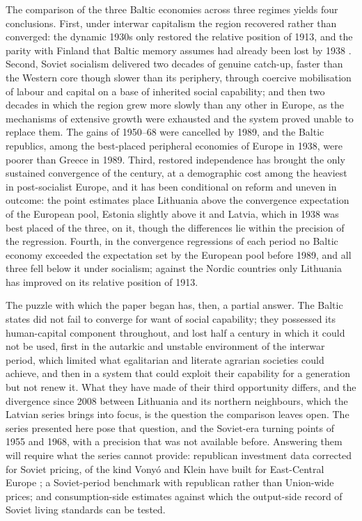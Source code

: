 The comparison of the three Baltic economies across three regimes yields four conclusions. First, under interwar capitalism the region recovered rather than converged: the dynamic 1930s only restored the relative position of 1913, and the parity with Finland that Baltic memory assumes had already been lost by 1938 \parencites[228]{vilpisauskas_2014_lithuania}[154]{norkus_2023_baltic}. Second, Soviet socialism delivered two decades of genuine catch-up, faster than the Western core though slower than its periphery, through coercive mobilisation of labour and capital on a base of inherited social capability; and then two decades in which the region grew more slowly than any other in Europe, as the mechanisms of extensive growth were exhausted and the system proved unable to replace them. The gains of 1950--68 were cancelled by 1989, and the Baltic republics, among the best-placed peripheral economies of Europe in 1938, were poorer than Greece in 1989. Third, restored independence has brought the only sustained convergence of the century, at a demographic cost among the heaviest in post-socialist Europe, and it has been conditional on reform and uneven in outcome: the point estimates place Lithuania above the convergence expectation of the European pool, Estonia slightly above it and Latvia, which in 1938 was best placed of the three, on it, though the differences lie within the precision of the regression. Fourth, in the convergence regressions of each period no Baltic economy exceeded the expectation set by the European pool before 1989, and all three fell below it under socialism; against the Nordic countries only Lithuania has improved on its relative position of 1913.

The puzzle with which the paper began has, then, a partial answer. The Baltic states did not fail to converge for want of social capability; they possessed its human-capital component throughout, and lost half a century in which it could not be used, first in the autarkic and unstable environment of the interwar period, which limited what egalitarian and literate agrarian societies could achieve, and then in a system that could exploit their capability for a generation but not renew it. What they have made of their third opportunity differs, and the divergence since 2008 between Lithuania and its northern neighbours, which the Latvian series brings into focus, is the question the comparison leaves open. The series presented here pose that question, and the Soviet-era turning points of 1955 and 1968, with a precision that was not available before. Answering them will require what the series cannot provide: republican investment data corrected for Soviet pricing, of the kind Vonyó and Klein have built for East-Central Europe \parencite{vonyo_whydidsocialistfail}; a Soviet-period benchmark with republican rather than Union-wide prices; and consumption-side estimates against which the output-side record of Soviet living standards can be tested.
